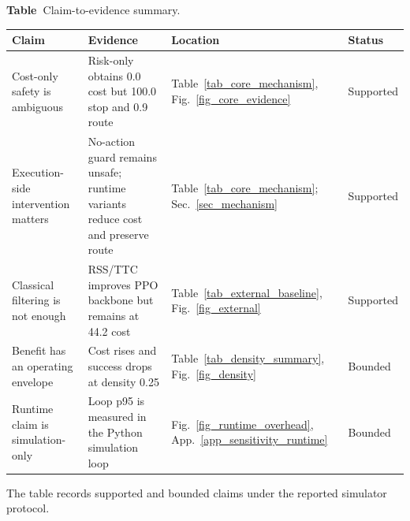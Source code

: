 
\begin{center}
\label{tab_claim_evidence}
\footnotesize
\textbf{Table~\thetable}\quad Claim-to-evidence summary.\par
\vspace{3pt}
\setlength{\tabcolsep}{3.4pt}
\renewcommand{\arraystretch}{1.08}
\begin{tabular}{@{}>{\raggedright\arraybackslash}p{}>{\raggedright\arraybackslash}p{}>{\raggedright\arraybackslash}p{}>{\raggedright\arraybackslash}p{}@{}}
\toprule
Claim & Evidence & Location & Status \\
\midrule
Cost-only safety is ambiguous & Risk-only obtains 0.0 cost but 100.0 stop and 0.9 route & Table~\ref{tab_core_mechanism}, Fig.~\ref{fig_core_evidence} & Supported \\
Execution-side intervention matters & No-action guard remains unsafe; runtime variants reduce cost and preserve route & Table~\ref{tab_core_mechanism}; Sec.~\ref{sec_mechanism} & Supported \\
Classical filtering is not enough & RSS/TTC improves PPO backbone but remains at 44.2 cost & Table~\ref{tab_external_baseline}, Fig.~\ref{fig_external} & Supported \\
Benefit has an operating envelope & Cost rises and success drops at density 0.25 & Table~\ref{tab_density_summary}, Fig.~\ref{fig_density} & Bounded \\
Runtime claim is simulation-only & Loop p95 is measured in the Python simulation loop & Fig.~\ref{fig_runtime_overhead}, App.~\ref{app_sensitivity_runtime} & Bounded \\
\bottomrule
\end{tabular}
\par\vspace{2pt}
\begin{minipage}{0.86\textwidth}
\footnotesize The table records supported and bounded claims under the reported simulator protocol.
\end{minipage}
\end{center}
